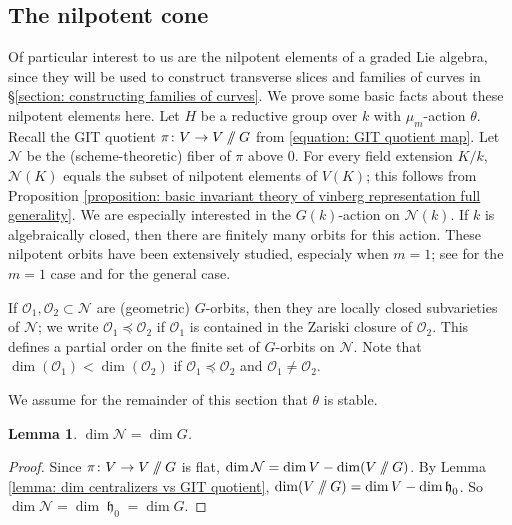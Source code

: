 \documentclass{article} %
\newtheorem{lemma}[proposition]{Lemma}
\numberwithin{equation}{section}
\theoremstyle{definition}
\DeclareMathOperator{\lieh}{\mathfrak{h}}
\renewcommand{\O}{\mathcal{O}}
\newcommand{\GIT}{\mathbin{/\mkern-6mu/}}
\newcommand{\calO}{\mathcal{O}}
\begin{document}
\subsection{The nilpotent cone}\label{subsec: nilpotent cone}



Of particular interest to us are the nilpotent elements of a graded Lie algebra, since they will be used to construct transverse slices and families of curves in \S\ref{section: constructing families of curves}.
We prove some basic facts about these nilpotent elements here.
Let $H$ be a reductive group over $k$ with $\mu_m$-action $\theta$.
Recall the GIT quotient $\pi\colon V\rightarrow V\GIT G$ from \eqref{equation: GIT quotient map}.
Let $\mathcal{N}$ be the (scheme-theoretic) fiber of $\pi$ above $0$.
For every field extension $K/k$, $\mathcal{N}(K)$ equals the subset of nilpotent elements of $V(K)$; this follows from Proposition \ref{proposition: basic invariant theory of vinberg representation full generality}.
We are especially interested in the $G(k)$-action on $\mathcal{N}(k)$.
If $k$ is algebraically closed, then there are finitely many orbits for this action.
These nilpotent orbits have been extensively studied, especialy when $m=1$; see \cite{CollingwoodMcGovern-nilpotentorbits} for the $m=1$ case and \cite{Vinberg-nilpotent, Vinberg-classificationnilpotentelementsthetagroups, deGraaf-nilporbitsthetagroups} for the general case.


If $\calO_1, \O_2\subset \mathcal{N}$ are (geometric) $G$-orbits, then they are locally closed subvarieties of  $\mathcal{N}$; we write $\O_1\preceq \O_2$ if $\O_1$ is contained in the Zariski closure of $\O_2$. 
This defines a partial order on the finite set of $G$-orbits on $\mathcal{N}$.
Note that $\dim(\calO_1)< \dim(\calO_2)$ if $\calO_1\preceq \calO_2$ and $\calO_1\neq \O_2$.



We assume for the remainder of this section that $\theta$ is stable. 

\begin{lemma}\label{lemma: dimension nilpotent cone}
$\dim \mathcal{N} = \dim G$. 
\end{lemma}
\begin{proof}
Since $\pi\colon V \rightarrow V \GIT G$ is flat, $\dim \mathcal{N} = \dim V -\dim(V\GIT G)$.
By Lemma \ref{lemma: dim centralizers vs GIT quotient}, $\dim(V \GIT G) = \dim V - \dim \lieh_0$.
So $\dim \mathcal{N} = \dim \lieh_0  = \dim G$.
\end{proof}
\end{document}
